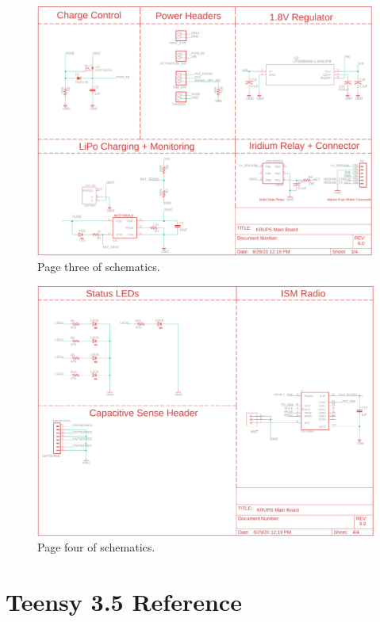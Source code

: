 \documentclass{article}
\begin{document}
\begin{figure}[H]
    \centering
    \includegraphics[width=\textwidth]{images/page3.png}
    \caption{Page three of schematics.}
    \label{fig:page1_3}
\end{figure}

\begin{figure}[H]
    \centering
    \includegraphics[width=\textwidth]{images/page4.png}
    \caption{Page four of schematics.}
    \label{fig:page1_4}
\end{figure}


\section{Teensy 3.5 Reference}
\end{document}
